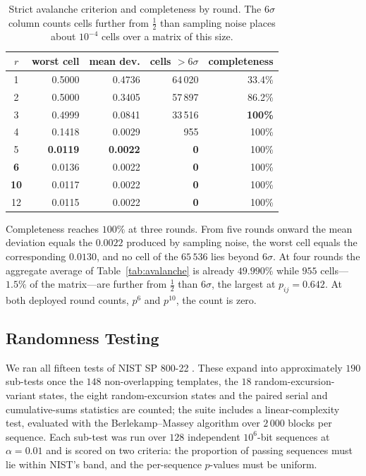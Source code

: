 \begin{table}[!t]
\centering
\caption{Strict avalanche criterion and completeness by round. The $6\sigma$
column counts cells further from $\tfrac{1}{2}$ than sampling noise places
about $10^{-4}$ cells over a matrix of this size.}
\label{tab:sac}
\small
\begin{tabular}{crrrr}
\hline
$r$ & worst cell & mean dev. & cells $>6\sigma$ & completeness\\
\hline
1 & 0.5000 & 0.4736 & 64\,020 & 33.4\%\\
2 & 0.5000 & 0.3405 & 57\,897 & 86.2\%\\
3 & 0.4999 & 0.0841 & 33\,516 & \textbf{100\%}\\
4 & 0.1418 & 0.0029 & 955 & 100\%\\
5 & \textbf{0.0119} & \textbf{0.0022} & \textbf{0} & 100\%\\
\textbf{6} & 0.0136 & 0.0022 & \textbf{0} & 100\%\\
\textbf{10} & 0.0117 & 0.0022 & \textbf{0} & 100\%\\
12 & 0.0115 & 0.0022 & \textbf{0} & 100\%\\
\hline
\end{tabular}
\end{table}

Completeness reaches $100\%$ at three rounds. From five rounds onward the mean
deviation equals the $0.0022$ produced by sampling noise, the worst cell equals
the corresponding $0.0130$, and no cell of the $65\,536$ lies beyond $6\sigma$.
At four rounds the aggregate average of Table~\ref{tab:avalanche} is already
$49.990\%$ while $955$ cells---$1.5\%$ of the matrix---are further from
$\tfrac{1}{2}$ than $6\sigma$, the largest at $p_{ij} = 0.642$. At both
deployed round counts, $p^{6}$ and $p^{10}$, the count is zero.

\subsection{Randomness Testing}
\label{sec:sec-sts}

We ran all fifteen tests of NIST SP 800-22 \cite{sp800-22}. These expand into
approximately $190$ sub-tests once the $148$ non-overlapping templates, the
$18$ random-excursion-variant states, the eight random-excursion states and the
paired serial and cumulative-sums statistics are counted; the suite includes a
linear-complexity test, evaluated with the Berlekamp--Massey algorithm
\cite{berlekamp-massey} over $2\,000$ blocks per sequence. Each sub-test was
run over $128$ independent $10^{6}$-bit sequences at $\alpha = 0.01$ and is
scored on two criteria: the proportion of passing sequences must lie within
NIST's band, and the per-sequence $p$-values must be uniform.

